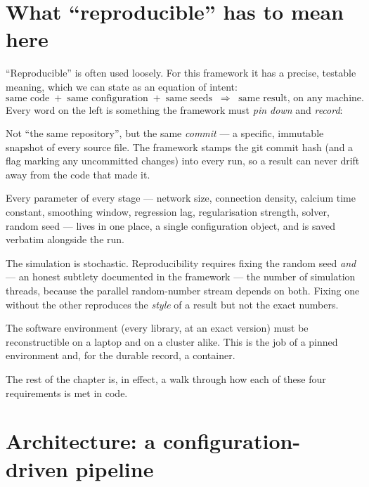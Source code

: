 \documentclass[11pt,a4paper]{article}
\begin{document}
\section{What ``reproducible'' has to mean here}
\label{sec:repro-defn}

``Reproducible'' is often used loosely. For this framework it has a precise, testable meaning,
which we can state as an equation of intent:
\[
\text{same code} \;+\; \text{same configuration} \;+\; \text{same seeds}
\;\;\Longrightarrow\;\; \text{same result, on any machine.}
\]
Every word on the left is something the framework must \emph{pin down} and \emph{record}:

\begin{description}[leftmargin=1.4em,style=nextline]
  \item[Same code.] Not ``the same repository'', but the same \emph{commit} --- a specific,
    immutable snapshot of every source file. The framework stamps the git commit hash (and a
    flag marking any uncommitted changes) into every run, so a result can never drift away from
    the code that made it.
  \item[Same configuration.] Every parameter of every stage --- network size, connection
    density, calcium time constant, smoothing window, regression lag, regularisation strength,
    solver, random seed --- lives in one place, a single configuration object, and is saved
    verbatim alongside the run.
  \item[Same seeds.] The simulation is stochastic. Reproducibility requires fixing the random
    seed \emph{and} --- an honest subtlety documented in the framework --- the number of
    simulation threads, because the parallel random-number stream depends on both. Fixing one
    without the other reproduces the \emph{style} of a result but not the exact numbers.
  \item[On any machine.] The software environment (every library, at an exact version) must be
    reconstructible on a laptop and on a cluster alike. This is the job of a pinned environment
    and, for the durable record, a container.
\end{description}

The rest of the chapter is, in effect, a walk through how each of these four requirements is
met in code.

\section{Architecture: a configuration-driven pipeline}
\label{sec:arch}
\end{document}
